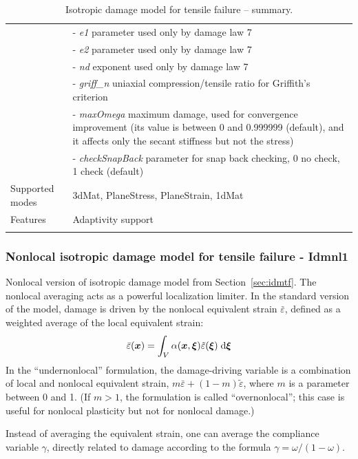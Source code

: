 \documentclass[a4paper]{article}
\newcommand{\mbf}[1]{\mbox{\boldmath$#1$}}
\newcommand{\param}[1]{{\it #1}}
\begin{document}
\begin{longtable}{|l|p{9cm}|}
&- \param{e1} parameter used only by damage law 7\\
&- \param{e2} parameter used only by damage law 7\\
&- \param{nd} exponent used only by damage law 7\\
&- \param{griff\_n} uniaxial compression/tensile ratio for Griffith's criterion\\
&- \param{maxOmega} maximum damage, used for convergence improvement
(its value is between 0 and 0.999999 (default), and it affects only the secant stiffness
but not the stress)\\
&- \param{checkSnapBack} parameter for snap back checking, 0 no check, 1 check (default)\\
Supported modes& 3dMat, PlaneStress, PlaneStrain, 1dMat\\
Features & Adaptivity support\\
\hline
\caption{Isotropic damage model for tensile failure -- summary.}
\label{id_table}
\end{longtable}

\subsubsection{Nonlocal isotropic damage model for tensile failure - Idmnl1}
\label{sec:nidm}
Nonlocal version of isotropic damage model from Section~\ref{sec:idmtf}.
The nonlocal averaging acts as a powerful localization
limiter. 
In the standard version of the model, 
damage is driven by the nonlocal equivalent strain $\bar{\varepsilon}$, 
defined as a weighted average of the local equivalent strain:
$$
\bar{\varepsilon}(\mbf{x}) = \int_V\alpha(\mbf{x},\mbf{\xi})\tilde\varepsilon(\mbf{\xi})\;{\rm d}\mbf{\xi}
$$
In the ``undernonlocal'' formulation, the damage-driving variable is a 
combination of local and nonlocal equivalent strain, 
$m\bar{\varepsilon}+(1-m)\tilde\varepsilon$, where $m$ is a parameter between
0 and 1. (If $m>1$, the formulation is called ``overnonlocal''; this case
is useful for nonlocal plasticity but not for nonlocal damage.) 

Instead
of averaging the equivalent strain, one can average the compliance variable
$\gamma$, directly related to damage according to the formula 
$\gamma=\omega/(1-\omega)$.
\end{document}
